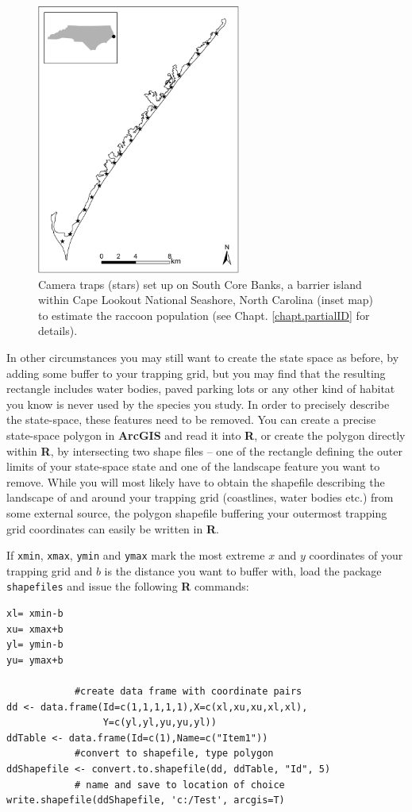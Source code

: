 \begin{figure}[ht]
\begin{center}
\includegraphics[height=3.5in]{Ch17-MCMC/figs/raccooncamera}
\end{center}
\caption{Camera traps (stars) set up on South Core Banks, a barrier island within Cape Lookout National Seashore, North Carolina (inset map) to estimate the raccoon population (see Chapt. \ref{chapt.partialID} for details).}
\label{mcmc.fig.raccooncamera}
\end{figure}

In other circumstances you may still want to create the state space as before, by adding some buffer to your trapping grid, but you may find that the resulting rectangle includes water bodies, paved parking lots or any other kind of habitat you know is never used by the species you study.
In order to precisely describe the state-space, these features need to be
removed. You can create a precise state-space polygon in {\bf ArcGIS} and
read it into {\bf R}, or create the polygon directly within {\bf R}, by intersecting two shape files -- one of the rectangle defining the outer limits of your state-space state and one of the landscape feature you want to remove.
While you will most likely have to obtain the shapefile describing the
landscape of and around your trapping grid (coastlines, water bodies etc.)
from some external source, the polygon shapefile buffering your outermost
trapping grid coordinates can easily be written in {\bf R}.

If \mbox{\tt xmin}, \mbox{\tt xmax}, \mbox{\tt ymin} and
\mbox{\tt ymax} mark the most extreme
$x$ and $y$ coordinates of your
trapping grid and $b$ is the distance you want to buffer with, load the
package \mbox{\tt shapefiles} \citep{stabler:2006} and issue the following
{\bf R} commands:
\begin{verbatim}
xl= xmin-b
xu= xmax+b
yl= ymin-b
yu= ymax+b

            #create data frame with coordinate pairs
dd <- data.frame(Id=c(1,1,1,1,1),X=c(xl,xu,xu,xl,xl),
				 Y=c(yl,yl,yu,yu,yl))
ddTable <- data.frame(Id=c(1),Name=c("Item1"))
            #convert to shapefile, type polygon
ddShapefile <- convert.to.shapefile(dd, ddTable, "Id", 5)
            # name and save to location of choice
write.shapefile(ddShapefile, 'c:/Test', arcgis=T)
\end{verbatim}

